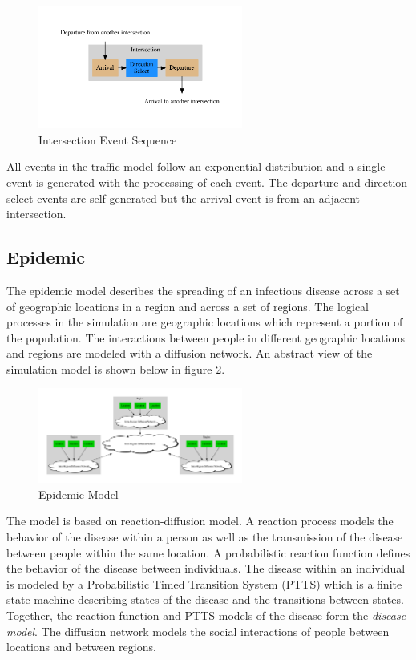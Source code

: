 \documentclass[11pt]{book}
\begin{document}
\begin{figure}[H]
    \centering
    \includegraphics[width=0.6\textwidth,quiet]{figs/graphviz/traffic_events.pdf}
    \caption{Intersection Event Sequence}\label{traffic_events}
\end{figure}

All events in the traffic model follow an exponential distribution and a single event
is generated with the processing of each event. The departure and direction select events
are self-generated but the arrival event is from an adjacent intersection.

\subsection{Epidemic}

The epidemic model describes the spreading of an infectious disease across a set of
geographic locations in a region and across a set of regions. The logical processes in
the simulation are geographic locations which represent a portion of the population. The
interactions between people in different geographic locations and regions are modeled with
a diffusion network. An abstract view of the simulation model is shown below in figure
\ref{epidemic_model}.

\begin{figure}[H]
    \centering
    \includegraphics[width=0.6\textwidth,quiet]{figs/graphviz/epidemic.pdf}
    \caption{Epidemic Model}\label{epidemic_model}
\end{figure}

The model is based on reaction-diffusion model\cite{perumalla-12}. A reaction process
models the behavior of the disease within a person as well as the transmission of the
disease between people within the same location. A probabilistic reaction function defines
the behavior of the disease between individuals\cite{barrett-08}. The disease within an
individual is modeled by a Probabilistic Timed Transition System (PTTS)\cite{barrett-08}
which is a finite state machine describing states of the disease and the transitions between states.
Together, the reaction function and PTTS models of the disease form the \emph{disease model}.
The diffusion network models the social interactions of people between locations and between
regions\cite{barrett-08}.
\end{document}
